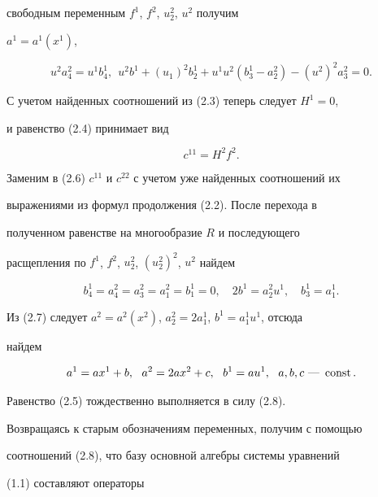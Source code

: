 свободным переменным $f^1$, $f^2$, $u^2_2$, $u^2$ получим 


$a^1=a^1(x^1)$, 


\begin{equation} 


u^2a^2_4=u^1b^1_4,\ \ u^2b^1+(u_1)^2b^1_2+u^1u^2 


(b^1_3-a^2_2)-(u^2)^2a^2_3=0. 


\end{equation} 


С учетом найденных соотношений из (2.3) теперь следует $H^1=0$, 


и равенство (2.4) принимает вид 


\begin{equation} 


c^{11}=H^2f^2. 


\end{equation} 


Заменим в (2.6) $c^{11}$ и $c^{22}$ с учетом уже найденных соотношений их 


выражениями из формул продолжения (2.2). После перехода в 


полученном равенстве на многообразие $R$ и последующего 


расщепления по $f^1$, $f^2$, $u^2_2$, $(u^2_2)^2$, $u^2$ найдем 


\begin{equation} 


b^1_4=a^2_4=a^2_3=a^2_1=b^1_1=0,\quad 


2b^1=a^2_2u^1,\quad b^1_3=a^1_1. 


\end{equation} 


Из (2.7) следует $a^2=a^2(x^2)$, $a^2_2=2a^1_1$, $b^1=a^1_1u^1$, отсюда 


найдем 


\begin{equation} 


a^1=ax^1+b,\ \ a^2=2ax^2+c,\ \ b^1=au^1,\ \ 


a,b,c\text{ --- }\const. 


\end{equation} 


Равенство (2.5) тождественно выполняется в силу (2.8). 


Возвращаясь к старым обозначениям переменных, получим с помощью 


соотношений (2.8), что базу основной алгебры системы уравнений 


(1.1) составляют операторы 


